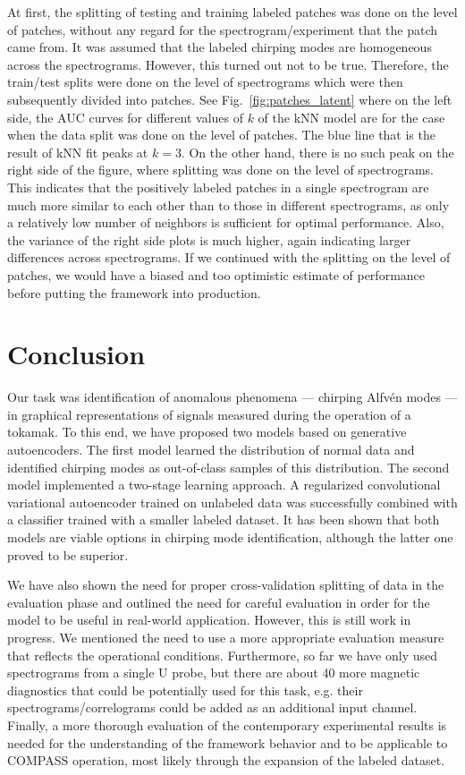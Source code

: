 At first, the splitting of testing and training labeled patches was done on the level of patches, without any regard for the spectrogram/experiment that the patch came from. It was assumed that the labeled chirping modes are homogeneous across the spectrograms. However, this turned out not to be true. Therefore, the train/test splits were done on the level of spectrograms which were then subsequently divided into patches. See Fig.~\ref{fig:patches_latent} where on the left side, the AUC curves for different values of $k$ of the kNN model are for the case when the data split was done on the level of patches. The blue line that is the result of kNN fit peaks at $k=3$. On the other hand, there is no such peak on the right side of the figure, where splitting was done on the level of spectrograms. This indicates that the positively labeled patches in a single spectrogram are much more similar to each other than to those in different spectrograms, as only a relatively low number of neighbors is sufficient for optimal performance. Also, the variance of the right side plots is much higher, again indicating larger differences across spectrograms. If we continued with the splitting on the level of patches, we would have a biased and too optimistic estimate of performance before putting the framework into production.

\section{Conclusion}
Our task was identification of anomalous phenomena --- chirping Alfv\'en modes --- in graphical representations of signals measured during the operation of a tokamak. To this end, we have proposed two models based on generative autoencoders. The first model learned the distribution of normal data and identified chirping modes as out-of-class samples of this distribution. The second model implemented a two-stage learning approach. A regularized convolutional variational autoencoder trained on unlabeled data was successfully combined with a classifier trained with a smaller labeled dataset. It has been shown that both models are viable options in chirping mode identification, although the latter one proved to be superior.

We have also shown the need for proper cross-validation splitting of data in the evaluation phase and outlined the need for careful evaluation in order for the model to be useful in real-world application. However, this is still work in progress. We mentioned the need to use a more appropriate evaluation measure that reflects the operational conditions. Furthermore, so far we have only used spectrograms from a single U probe, but there are about 40 more magnetic diagnostics that could be potentially used for this task, e.g. their spectrograms/correlograms could be added as an additional input channel. Finally, a more thorough evaluation of the contemporary experimental results is needed for the understanding of the framework behavior and to be applicable to COMPASS operation, most likely through the expansion of the labeled dataset. 
